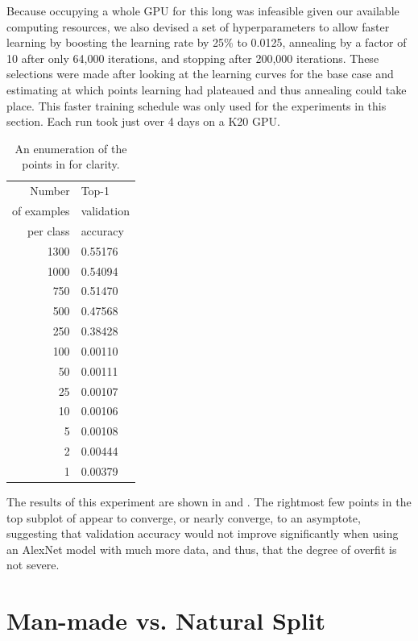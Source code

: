 Because occupying a whole GPU for this long was infeasible given our available computing resources, we also
devised a set of hyperparameters to allow faster learning by boosting
the learning rate by 25\% to 0.0125, annealing by a factor of 10 after
only 64,000 iterations, and stopping after 200,000 iterations. These
selections were made after looking at the learning curves for the base
case and estimating at which points learning had plateaued and thus annealing could take
place.  This faster training schedule was only used for the
experiments in this section. Each run took just over 4 days on a K20
GPU.

\begin{table}[th]
\caption{An enumeration of the points in  for clarity.}
\begin{center}
\begin{tabular}{|r|l|}
\hline
Number        & Top-1 \\
 of examples  & validation \\
per class           & accuracy \\
\hline
1300  &  0.55176  \\
1000  &  0.54094  \\
750   &  0.51470   \\
500   &  0.47568   \\
250   &  0.38428   \\
100   &  0.00110   \\
50    &  0.00111   \\
25    &  0.00107   \\
10    &  0.00106   \\
5     &  0.00108   \\
2     &  0.00444   \\
1     &  0.00379   \\
\hline
\end{tabular}
\end{center}
\end{table}

The results of this experiment are shown in 
and . The rightmost few points in the top subplot
of  appear to converge, or nearly converge, to an
asymptote, suggesting that validation accuracy would not improve
significantly when using an AlexNet model with much more data, and
thus, that the degree of overfit is not severe.



\section{Man-made vs. Natural Split}

